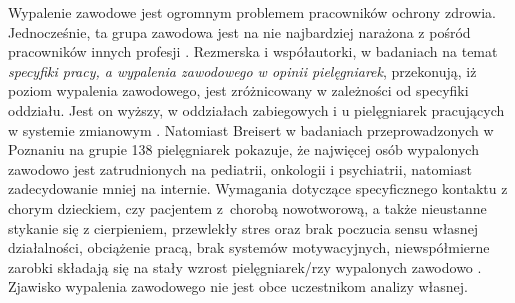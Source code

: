 \documentclass[a4paper,12pt,twoside,openright]{mwrep}
\begin{document}
Wypalenie zawodowe jest ogromnym problemem pracowników ochrony zdrowia. Jednocześnie, ta grupa zawodowa jest na nie najbardziej narażona z pośród pracowników innych profesji \cite{wypal}. Rezmerska i współautorki, w badaniach na temat \textit{specyfiki pracy, a wypalenia zawodowego w opinii pielęgniarek},  przekonują, iż poziom wypalenia zawodowego, jest zróżnicowany w zależności od specyfiki oddziału. Jest on wyższy, w oddziałach zabiegowych i  u pielęgniarek pracujących w systemie zmianowym \cite{zmiany}. Natomiast Breisert w badaniach przeprowadzonych w Poznaniu na grupie 138 pielęgniarek pokazuje, że najwięcej osób wypalonych zawodowo jest zatrudnionych na pediatrii, onkologii i psychiatrii, natomiast zadecydowanie mniej na internie. Wymagania dotyczące specyficznego kontaktu z chorym dzieckiem, czy pacjentem z~chorobą nowotworową,  a także nieustanne stykanie się z cierpieniem,  przewlekły stres oraz brak poczucia sensu własnej działalności, obciążenie pracą, brak systemów motywacyjnych, niewspółmierne zarobki składają się na stały wzrost  pielęgniarek/rzy wypalonych zawodowo \cite{breisert}. Zjawisko wypalenia zawodowego nie jest obce uczestnikom analizy własnej.

  
 
\end{document}
